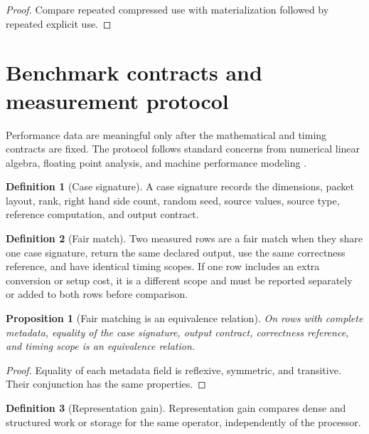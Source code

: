 \documentclass{aomart}
\newtheorem{proposition}[proposition]{Proposition}
\theoremstyle{definition}
\newtheorem{definition}[definition]{Definition}
\theoremstyle{remark}
\begin{document}
\begin{proof}
Compare repeated compressed use with materialization followed by repeated explicit use.
\end{proof}

\section{Benchmark contracts and measurement protocol}\label{sec:benchmark_protocol}

Performance data are meaningful only after the mathematical and timing contracts are fixed. The protocol follows standard concerns from numerical linear algebra, floating point analysis, and machine performance modeling \cite{Higham2002,GolubVanLoan2013,WilliamsWatermanPatterson2009}.

\begin{definition}[Case signature]\label{def:case_signature}
A case signature records the dimensions, packet layout, rank, right hand side count, random seed, source values, source type, reference computation, and output contract.
\end{definition}

\begin{definition}[Fair match]\label{def:fair_match}
Two measured rows are a fair match when they share one case signature, return the same declared output, use the same correctness reference, and have identical timing scopes. If one row includes an extra conversion or setup cost, it is a different scope and must be reported separately or added to both rows before comparison.
\end{definition}

\begin{proposition}[Fair matching is an equivalence relation]\label{prop:fair_equivalence}
On rows with complete metadata, equality of the case signature, output contract, correctness reference, and timing scope is an equivalence relation.
\end{proposition}

\begin{proof}
Equality of each metadata field is reflexive, symmetric, and transitive. Their conjunction has the same properties.
\end{proof}

\begin{definition}[Representation gain]\label{def:representation_gain}
Representation gain compares dense and structured work or storage for the same operator, independently of the processor.
\end{definition}
\end{document}
